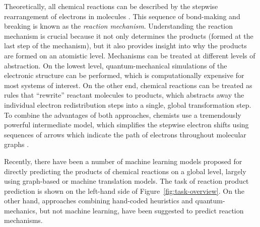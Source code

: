 


Theoretically, all chemical reactions can be described by the stepwise rearrangement of electrons in molecules \cite{herges1994organizing}. 
This sequence of bond-making and breaking is known as the \emph{reaction mechanism}. 
Understanding the reaction mechanism is crucial because it not only determines the products (formed at the last step of the mechanism), 
but it also provides insight into why the products are formed on an atomistic level. 
%
Mechanisms can be treated at different levels of abstraction. On the lowest level, quantum-mechanical simulations of the electronic structure can be performed, which is computationally expensive for most systems of interest. 
On the other end, chemical reactions can be treated as rules that ``rewrite'' reactant molecules to products, which abstracts away the individual electron redistribution steps into a single, global transformation step. 
To combine the advantages of both approaches, chemists use a tremendously powerful intermediate model, which simplifies the stepwise electron shifts using sequences of arrows which indicate the path of electrons throughout molecular graphs \cite{herges1994organizing}. 


Recently, there have been a number of machine learning models proposed for directly predicting the products of chemical reactions on a global level\cite{coley2017prediction,jin2017predicting,schwaller2017found,neural-symbolic,segler2018planning,wei2016neural}, largely using graph-based or machine translation models. The task of reaction product prediction is shown on the left-hand side of Figure~\ref{fig:task-overview}. On the other hand, approaches combining hand-coded heuristics and quantum-mechanics, but not machine learning, have been suggested to predict reaction mechanisms.\cite{kim2018efficient,rappoport2014complex,zimmerman2013automated,bergeler2015heuristics,simm2017context}


